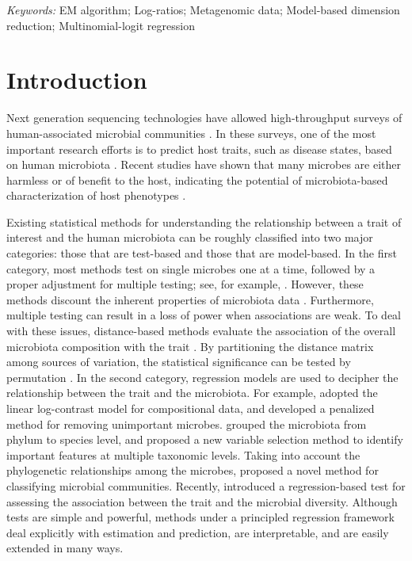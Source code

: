 \documentclass[12pt]{article}
\begin{document}
\noindent%
{\it Keywords:} EM algorithm; Log-ratios; Metagenomic data; Model-based dimension reduction; Multinomial-logit regression

\vfill

\newpage
{} %

\section{Introduction}

Next generation sequencing technologies have allowed high-throughput surveys of human-associated microbial communities \citep{turnbaugh2007human}. In these surveys, one of the most important research efforts  is to predict host traits, such as disease states, based on human microbiota \citep{knights2011human}. Recent studies have shown that many microbes are either harmless or of benefit to the host, indicating the potential of microbiota-based characterization of host phenotypes \citep{cho2012human}.

Existing statistical methods for understanding the relationship between a trait of interest and the human microbiota can be roughly classified into two major categories: those that are test-based and those that are model-based. In the first category, most methods test on single microbes one at a time, followed by a proper adjustment for multiple testing; see, for example, \citet{le2013richness}. However, these methods discount the inherent properties of microbiota data \citep{li2015microbiome}. Furthermore, multiple testing can result in a loss of power when associations are weak. To deal with these issues, distance-based methods evaluate the association of the overall microbiota composition with the trait \citep{charlson2010disordered}. By partitioning the distance matrix among sources of variation, the statistical significance can be tested by permutation \citep{mcardle2001fitting}. %
In the second category, regression models are used to decipher the relationship between the trait and the microbiota. For example, \citet{lin2014variable} adopted the linear log-contrast model for compositional data, and
developed a penalized method for removing unimportant microbes. \citet{garcia2014identification} grouped the microbiota from phylum to species level, and proposed a new variable selection method to identify important features at multiple taxonomic levels. Taking into account the phylogenetic relationships among the microbes, \citet{tanaseichuk2014phylogeny} proposed a novel method for classifying microbial communities. Recently, \citet{zhao2015testing} introduced a regression-based test for assessing the association between the trait and the microbial diversity. Although tests are simple and powerful, methods under a principled regression framework deal explicitly with estimation and prediction, are interpretable, and are easily extended in many ways.
\end{document}
